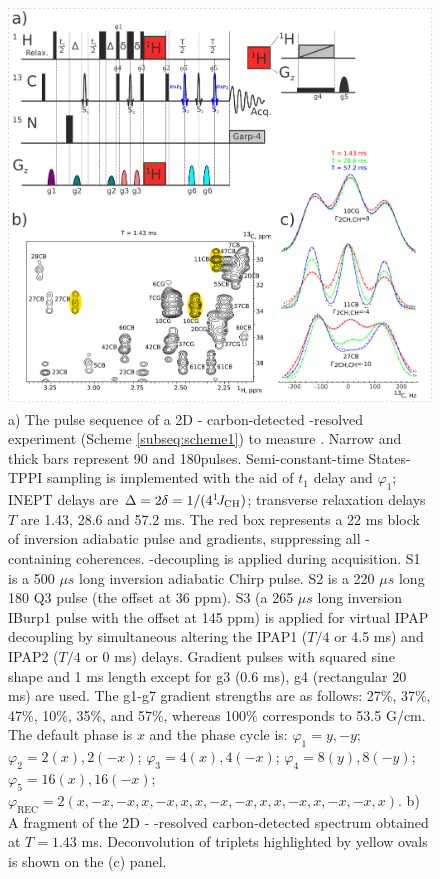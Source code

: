 \documentclass[twocolumn]{svjour3}           %
\begin{document}
\begin{figure}
 \includegraphics[width=1.0\textwidth]{Fig1}
 \caption{
 a) The pulse sequence of a 2D \hlab-\clab{} carbon-detected 
 \oneJch-resolved experiment (Scheme \ref{subseq:scheme1}) 
 to measure \gtwoCH{}. Narrow and thick bars represent 90\degree 
 and 180\degree pulses. Semi-constant-time \hlab{} States-{TPPI} 
 sampling is implemented with the aid of $t_1$ delay and 
 $\varphi_1$; {INEPT} delays are $\Delta = 2\delta = 1/(4^1\!J_\text{CH})$; 
 transverse relaxation delays $T$ are 1.43, 28.6 and 57.2 ms. 
 The red box represents a 22 ms block of \hlab{} inversion adiabatic pulse and gradients\cite{thrippleton_elimination_2003,harris_zero-quantum_2011}, suppressing all \hlab-containing coherences. 
 \nlab-decoupling is applied during acquisition. 
 S1 is a 500 $\mu s$ long \clab{} inversion adiabatic Chirp pulse. 
 S2 is a 220 $\mu s$ long 180\degree{} Q3 pulse (the offset at 36 ppm). 
 S3 (a 265 $\mu s$ long inversion IBurp1 pulse with the offset 
 at 145 ppm) is applied for virtual IPAP decoupling by simultaneous 
 altering the IPAP1 ($T/4$ or 4.5 ms) and IPAP2 ($T/4$ or 0 ms) 
 delays. Gradient pulses with squared sine shape and 1 ms length 
 except for g3 (0.6 ms), g4 (rectangular 20 ms) are used. 
 The g1-g7 gradient strengths are as follows: 27\%, 37\%, 47\%, 10\%, 35\%, and 57\%, whereas 100\% corresponds to 53.5 G/cm.
 The default phase is $x$ and the phase cycle is: 
 $\varphi_1 = y, -y$; 
 $\varphi_2 = 2(x), 2(-x)$; 
 $\varphi_3 = 4(x), 4(-x)$; 
 $\varphi_4 = 8(y), 8(-y)$; 
 $\varphi_5 = 16(x), 16(-x)$; 
 $\varphi_\text{REC} = 2(x, -x, -x, x, -x, x, x, -x, -x, x, x, -x, x, -x, -x, x)$. 
 b) A fragment of the 2D \hlab-\clab{} \oneJch-resolved carbon-detected 
 spectrum obtained at $T = 1.43$ ms. 
 Deconvolution of triplets highlighted  by yellow ovals is shown on 
 the (c) panel.
 }
 \label{fig:scheme1}
\end{figure}
\end{document}
